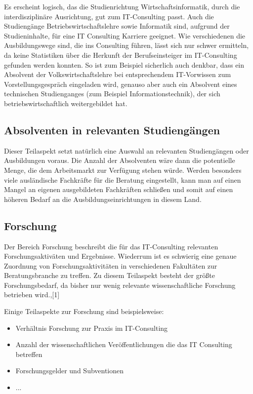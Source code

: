 Es erscheint logisch, das die Studienrichtung Wirtschaftsinformatik, durch die interdisziplinäre Ausrichtung, gut zum IT-Consulting passt. Auch die Studiengänge Betriebswirtschaftslehre sowie Informatik sind, aufgrund der Studieninhalte, für eine IT Consulting Karriere geeignet. Wie verschiedenen die Ausbildungswege sind, die ins Consulting führen, lässt sich nur schwer ermitteln, da keine Statistiken über die Herkunft der Berufseinsteiger im IT-Consulting gefunden werden konnten.
So ist zum Beispiel sicherlich auch denkbar, dass ein Absolvent der Volkswirtschaftslehre bei entsprechendem IT-Vorwissen zum Vorstellungsgespräch eingeladen wird, genauso aber auch ein Absolvent eines technischen Studienganges (zum Beispiel Informationstechnik), der sich betriebswirtschaftlich weitergebildet hat.

\subsection*{Absolventen in relevanten Studiengängen}
Dieser Teilaspekt setzt natürlich eine Auswahl an relevanten Studiengängen oder Ausbildungen voraus. Die Anzahl der Absolventen wäre dann die potentielle Menge, die dem Arbeitsmarkt zur Verfügung stehen würde. Werden besonders viele ausländische Fachkräfte für die Beratung eingestellt, kann man auf einen Mangel an eigenen ausgebildeten Fachkräften schließen und somit auf einen höheren Bedarf an die Ausbildungseinrichtungen in diesem Land.

\subsection*{Forschung}
Der Bereich Forschung beschreibt die für das IT-Consulting relevanten Forschungsaktiväten und Ergebnisse. Wiederrum ist es schwierig eine genaue Zuordnung von Forschungsaktivitäten in verschiedenen Fakultäten zur Beratungsbranche zu treffen. Zu diesem Teilaspekt besteht der größte Forschungsbedarf, da bisher nur wenig relevante wissenschaftliche Forschung betrieben wird.\cite[10]{nissen2007consulting},\cite{IDSScheer}[1]

Einige Teilaspekte zur Forschung sind beispielsweise:
\begin{itemize}
\item Verhältnis Forschung zur Praxis im IT-Consulting
\item Anzahl der wissenschaftlichen Veröffentlichungen die das IT Consulting betreffen
\item Forschungsgelder und Subventionen
\item ...
\end{itemize}

